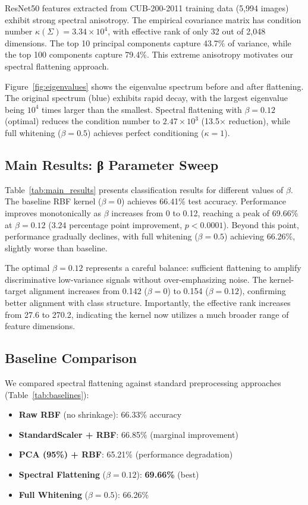 \documentclass[11pt]{article}
\begin{document}
ResNet50 features extracted from CUB-200-2011 training data (5,994 images) exhibit strong spectral anisotropy. The empirical covariance matrix has condition number $\kappa(\Sigma) = 3.34 \times 10^4$, with effective rank of only 32 out of 2,048 dimensions. The top 10 principal components capture 43.7\% of variance, while the top 100 components capture 79.4\%. This extreme anisotropy motivates our spectral flattening approach.

Figure~\ref{fig:eigenvalues} shows the eigenvalue spectrum before and after flattening. The original spectrum (blue) exhibits rapid decay, with the largest eigenvalue being $10^4$ times larger than the smallest. Spectral flattening with $\beta=0.12$ (optimal) reduces the condition number to $2.47 \times 10^3$ (13.5$\times$ reduction), while full whitening ($\beta=0.5$) achieves perfect conditioning ($\kappa=1$).

\subsection{Main Results: β Parameter Sweep}

Table~\ref{tab:main_results} presents classification results for different values of $\beta$. The baseline RBF kernel ($\beta=0$) achieves 66.41\% test accuracy. Performance improves monotonically as $\beta$ increases from 0 to 0.12, reaching a peak of 69.66\% at $\beta=0.12$ (3.24 percentage point improvement, $p < 0.0001$). Beyond this point, performance gradually declines, with full whitening ($\beta=0.5$) achieving 66.26\%, slightly worse than baseline.

The optimal $\beta=0.12$ represents a careful balance: sufficient flattening to amplify discriminative low-variance signals without over-emphasizing noise. The kernel-target alignment increases from 0.142 ($\beta=0$) to 0.154 ($\beta=0.12$), confirming better alignment with class structure. Importantly, the effective rank increases from 27.6 to 270.2, indicating the kernel now utilizes a much broader range of feature dimensions.

\subsection{Baseline Comparison}

We compared spectral flattening against standard preprocessing approaches (Table~\ref{tab:baselines}):

\begin{itemize}
    \item \textbf{Raw RBF} (no shrinkage): 66.33\% accuracy
    \item \textbf{StandardScaler + RBF}: 66.85\% (marginal improvement)
    \item \textbf{PCA (95\%) + RBF}: 65.21\% (performance degradation)
    \item \textbf{Spectral Flattening} ($\beta=0.12$): \textbf{69.66\%} (best)
    \item \textbf{Full Whitening} ($\beta=0.5$): 66.26\%
\end{itemize}
\end{document}
